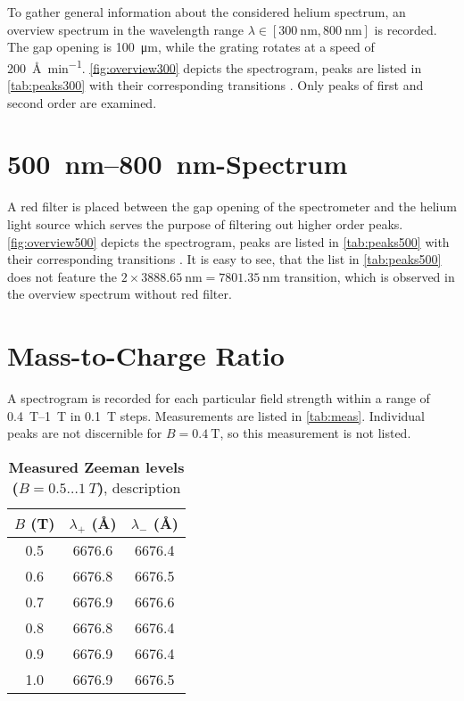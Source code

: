 To gather general information about the considered helium spectrum, an overview spectrum in the wavelength range $\lambda\in [\SI{300}{\nm}, \SI{800}{\nm}]$ is recorded.
The gap opening is \SI{100}{\um}, while the grating rotates at a speed of \SI{200}{\angstrom\per\minute}.
\autoref{fig:overview300} depicts the spectrogram, peaks are listed in \autoref{tab:peaks300} with their corresponding transitions \cite{hetrans}.
Only peaks of first and second order are examined.

\section{\SIrange{500}{800}{\nm}-Spectrum}
A red filter is placed between the gap opening of the spectrometer and the helium light source which serves the purpose of filtering out higher order peaks.
\autoref{fig:overview500} depicts the spectrogram, peaks are listed in \autoref{tab:peaks500} with their corresponding transitions \cite{hetrans}.
It is easy to see, that the list in \autoref{tab:peaks500} does not feature the $2\times\SI{3888.65}{\nm} = \SI{7801.35}{\nm}$ transition, which is observed in the overview spectrum without red filter.


\section{Mass-to-Charge Ratio}
A spectrogram is recorded for each particular field strength within a range of \SIrange{0.4}{1}{\tesla} in \SI{0.1}{\tesla} steps.
Measurements are listed in \autoref{tab:meas}.
Individual peaks are not discernible for $B = \SI{0.4}{\tesla}$, so this measurement is not listed.

\begin{table}[tbp]
	\centering
	\caption[Measured Zeeman levels ($B = \num{0.5} \dots \SI{1}{T}$)]{\textbf{Measured Zeeman levels ($B = \num{0.5} \dots \SI{1}{T}$)}, description}
	\label{tab:meas}
	\begin{tabular}{SSS}
		\toprule
		{$B$ (\si{\tesla})}& {$\lambda_+$ (\si{\angstrom})}& {$\lambda_-$ (\si{\angstrom})}\\
		&	6676.6&	6676.4\\
		0.6&	6676.8&	6676.5\\
		0.7&	6676.9&	6676.6\\
		0.8&	6676.8&	6676.4\\
		0.9&	6676.9&	6676.4\\
		1.0&	6676.9&	6676.5\\
		\bottomrule
	\end{tabular}
\end{table}

